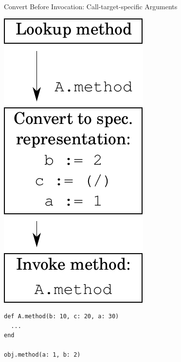 \documentclass[xcolor=dvipsname]{beamer} %
\begin{document}
\begin{frame}[fragile]{Convert Before Invocation: Call-target-specific Arguments}
\begin{minipage}{0.3\textwidth}
\centering
\includegraphics[height=0.6\textheight]{convert_before.pdf}
\end{minipage} %
\begin{minipage}{0.65\textwidth}
\begin{lstlisting}
def A.method(b: 10, c: 20, a: 30)
  ...
end

obj.method(a: 1, b: 2)
\end{lstlisting}
\end{minipage}
\end{frame}
\end{document}
